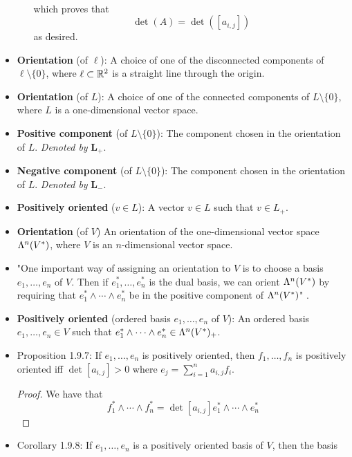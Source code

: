 \documentclass[../notes.tex]{subfiles}
\begin{document}
\begin{itemize}
\begin{itemize}
\begin{align*}
        \end{align*}
        which proves that
        \begin{equation*}
            \det(A) = \det([a_{i,j}])
        \end{equation*}
        as desired.
    \end{itemize}
    \item \textbf{Orientation} (of $\ell$): A choice of one of the disconnected components of $\ell\setminus\{0\}$, where $\ell\subset\R^2$ is a straight line through the origin.
    \item \textbf{Orientation} (of $L$): A choice of one of the connected components of $L\setminus\{0\}$, where $L$ is a one-dimensional vector space.
    \item \textbf{Positive component} (of $L\setminus\{0\}$): The component chosen in the orientation of $L$. \emph{Denoted by} $\bm{L_+}$.
    \item \textbf{Negative component} (of $L\setminus\{0\}$): The component chosen in the orientation of $L$. \emph{Denoted by} $\bm{L_-}$.
    \item \textbf{Positively oriented} ($v\in L$): A vector $v\in L$ such that $v\in L_+$.
    \item \textbf{Orientation} (of $V$) An orientation of the one-dimensional vector space $\lam[n]{V^*}$, where $V$ is an $n$-dimensional vector space.
    \item "One important way of assigning an orientation to $V$ is to choose a basis $e_1,\dots,e_n$ of $V$. Then if $e_1^*,\dots,e_n^*$ is the dual basis, we can orient $\lam[n]{V^*}$ by requiring that $e_1^*\wedge\cdots\wedge e_n^*$ be in the positive component of $\lam[n]{V^*}$" \parencite[29]{bib:DifferentialForms}.
    \item \textbf{Positively oriented} (ordered basis $e_1,\dots,e_n$ of $V$): An ordered basis $e_1,\dots,e_n\in V$ such that $e_1^*\wedge\cdots\wedge e_n^*\in\lam[n]{V^*}_+$.
    \item Proposition 1.9.7: If $e_1,\dots,e_n$ is positively oriented, then $f_1,\dots,f_n$ is positively oriented iff $\det[a_{i,j}]>0$ where $e_j=\sum_{i=1}^na_{i,j}f_i$.
    \begin{proof}
        We have that
        \begin{equation*}
            f_1^*\wedge\cdots\wedge f_n^* = \det[a_{i,j}]e_1^*\wedge\cdots\wedge e_n^*
        \end{equation*}
    \end{proof}
    \item Corollary 1.9.8: If $e_1,\dots,e_n$ is a positively oriented basis of $V$, then the basis

\end{itemize}
\end{document}
